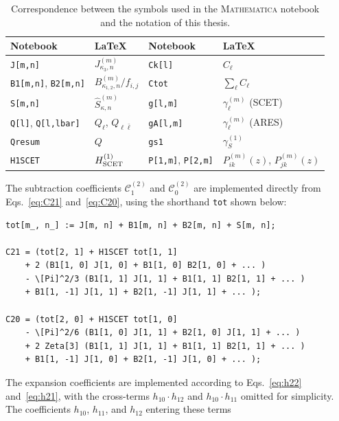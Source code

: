 \begin{table}[h]
\begin{center}
\begin{tabular}{ll|ll}
\hline\hline
Notebook & LaTeX & Notebook & LaTeX \\
\hline\hline
\texttt{J[m,n]} & $J^{(m)}_{\kappa_3,n}$ &
\texttt{Ck[l]} & $C_\ell$ \\
\texttt{B1[m,n]}, \texttt{B2[m,n]} &
$B^{(m)}_{\kappa_{1,2},n}/f_{i,j}$ &
\texttt{Ctot} & $\sum_\ell C_\ell$ \\
\texttt{S[m,n]} & $\widehat{S}^{(m)}_{\kappa,n}$ &
\texttt{g[l,m]} & $\gamma^{(m)}_\ell$ (SCET) \\
\texttt{Q[l]}, \texttt{Q[l,lbar]} &
$Q_\ell$, $Q_{\ell\bar\ell}$ &
\texttt{gA[l,m]} & $\gamma^{(m)}_\ell$ (ARES) \\
\texttt{Qresum} & $Q$ &
\texttt{gs1} & $\gamma^{(1)}_S$ \\
\texttt{H1SCET} & $H^{(1)}_{\rm SCET}$ &
\texttt{P[1,m]}, \texttt{P[2,m]} & $P^{(m)}_{ik}(z)$, $P^{(m)}_{jk}(z)$ \\
\hline\hline
\end{tabular}
\end{center}
\caption{Correspondence between the symbols used in the
\textsc{Mathematica} notebook and the notation of this thesis.}
\label{tab:mma-symbols}
\end{table}
The subtraction coefficients $\mathcal{C}^{(2)}_1$ and
$\mathcal{C}^{(2)}_0$ are implemented directly from
Eqs.~\eqref{eq:C21} and~\eqref{eq:C20}, using the shorthand
\texttt{tot} shown below:
\begin{lstlisting}[style=mma, caption={Implementation of
$\mathcal{C}^{(2)}_1$ and $\mathcal{C}^{(2)}_0$.}]
tot[m_, n_] := J[m, n] + B1[m, n] + B2[m, n] + S[m, n];

C21 = (tot[2, 1] + H1SCET tot[1, 1]
    + 2 (B1[1, 0] J[1, 0] + B1[1, 0] B2[1, 0] + ... )
    - \[Pi]^2/3 (B1[1, 1] J[1, 1] + B1[1, 1] B2[1, 1] + ... )
    + B1[1, -1] J[1, 1] + B2[1, -1] J[1, 1] + ... );

C20 = (tot[2, 0] + H1SCET tot[1, 0]
    - \[Pi]^2/6 (B1[1, 0] J[1, 1] + B2[1, 0] J[1, 1] + ... )
    + 2 Zeta[3] (B1[1, 1] J[1, 1] + B1[1, 1] B2[1, 1] + ... )
    + B1[1, -1] J[1, 0] + B2[1, -1] J[1, 0] + ... );
\end{lstlisting}
The expansion coefficients are implemented according to
Eqs.~\eqref{eq:h22} and~\eqref{eq:h21}, with the cross-terms
$h_{10}\cdot h_{12}$ and $h_{10}\cdot h_{11}$ omitted for simplicity.
The coefficients $h_{10}$, $h_{11}$, and $h_{12}$ entering these terms
